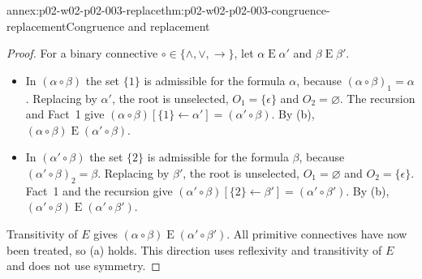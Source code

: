 \begin{annexitem}{annex:p02-w02-p02-003-replace}{thm:p02-w02-p02-003-congruence-replacement}{Congruence and replacement}
\begin{proof}
For a binary connective \(\circ\in\{\land,\lor,\to\}\), let
\(\alpha\mathrel{E}\alpha'\) and \(\beta\mathrel{E}\beta'\).
\begin{itemize}
  \item In \((\alpha\circ\beta)\) the set \(\{1\}\) is admissible for the
        formula \(\alpha\), because \((\alpha\circ\beta)_1=\alpha\).
        Replacing by \(\alpha'\), the root is unselected, \(O_1=\{\epsilon\}\)
        and \(O_2=\varnothing\).  The recursion and Fact~1 give
        \((\alpha\circ\beta)[\{1\}\leftarrow\alpha']
         =(\alpha'\circ\beta)\).  By (b),
        \((\alpha\circ\beta)\mathrel{E}(\alpha'\circ\beta)\).
  \item In \((\alpha'\circ\beta)\) the set \(\{2\}\) is admissible for the
        formula \(\beta\), because \((\alpha'\circ\beta)_2=\beta\).
        Replacing by \(\beta'\), the root is unselected, \(O_1=\varnothing\)
        and \(O_2=\{\epsilon\}\).  Fact~1 and the recursion give
        \((\alpha'\circ\beta)[\{2\}\leftarrow\beta']
         =(\alpha'\circ\beta')\).  By (b),
        \((\alpha'\circ\beta)\mathrel{E}(\alpha'\circ\beta')\).
\end{itemize}
Transitivity of \(E\) gives
\((\alpha\circ\beta)\mathrel{E}(\alpha'\circ\beta')\).  All primitive
connectives have now been treated, so (a) holds.  This direction uses
reflexivity and transitivity of \(E\) and does not use symmetry.
\end{proof}
\end{annexitem}

